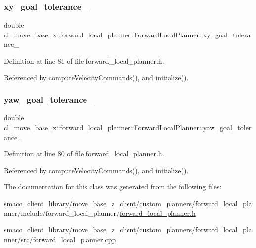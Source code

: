 \subsubsection{\texorpdfstring{xy\+\_\+goal\+\_\+tolerance\+\_\+}{xy\_goal\_tolerance\_}}
{\footnotesize\ttfamily double cl\+\_\+move\+\_\+base\+\_\+z\+::forward\+\_\+local\+\_\+planner\+::\+Forward\+Local\+Planner\+::xy\+\_\+goal\+\_\+tolerance\+\_\+\hspace{0.3cm}{\ttfamily [private]}}



Definition at line 81 of file forward\+\_\+local\+\_\+planner.\+h.



Referenced by compute\+Velocity\+Commands(), and initialize().

\mbox{\label{classcl__move__base__z_1_1forward__local__planner_1_1ForwardLocalPlanner_a7ea1ca266850c7b847a2355f489e6041}} 
\subsubsection{\texorpdfstring{yaw\+\_\+goal\+\_\+tolerance\+\_\+}{yaw\_goal\_tolerance\_}}
{\footnotesize\ttfamily double cl\+\_\+move\+\_\+base\+\_\+z\+::forward\+\_\+local\+\_\+planner\+::\+Forward\+Local\+Planner\+::yaw\+\_\+goal\+\_\+tolerance\+\_\+\hspace{0.3cm}{\ttfamily [private]}}



Definition at line 80 of file forward\+\_\+local\+\_\+planner.\+h.



Referenced by compute\+Velocity\+Commands(), and initialize().



The documentation for this class was generated from the following files\+:\begin{DoxyCompactItemize}
\item 
smacc\+\_\+client\+\_\+library/move\+\_\+base\+\_\+z\+\_\+client/custom\+\_\+planners/forward\+\_\+local\+\_\+planner/include/forward\+\_\+local\+\_\+planner/\hyperlink{forward__local__planner_8h}{forward\+\_\+local\+\_\+planner.\+h}\item 
smacc\+\_\+client\+\_\+library/move\+\_\+base\+\_\+z\+\_\+client/custom\+\_\+planners/forward\+\_\+local\+\_\+planner/src/\hyperlink{forward__local__planner_8cpp}{forward\+\_\+local\+\_\+planner.\+cpp}\end{DoxyCompactItemize}
